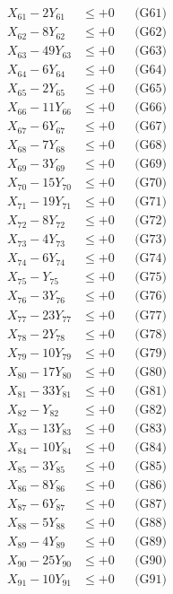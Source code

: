 \documentclass[a4paper,10pt]{article}
\begin{document}
{\begin{align}
X_{61} - 2Y_{61} &\leq +0 && \text{(G61)} \\
X_{62} - 8Y_{62} &\leq +0 && \text{(G62)} \\
X_{63} - 49Y_{63} &\leq +0 && \text{(G63)} \\
\allowbreak
X_{64} - 6Y_{64} &\leq +0 && \text{(G64)} \\
X_{65} - 2Y_{65} &\leq +0 && \text{(G65)} \\
X_{66} - 11Y_{66} &\leq +0 && \text{(G66)} \\
X_{67} - 6Y_{67} &\leq +0 && \text{(G67)} \\
X_{68} - 7Y_{68} &\leq +0 && \text{(G68)} \\
X_{69} - 3Y_{69} &\leq +0 && \text{(G69)} \\
X_{70} - 15Y_{70} &\leq +0 && \text{(G70)} \\
X_{71} - 19Y_{71} &\leq +0 && \text{(G71)} \\
X_{72} - 8Y_{72} &\leq +0 && \text{(G72)} \\
X_{73} - 4Y_{73} &\leq +0 && \text{(G73)} \\
\allowbreak
X_{74} - 6Y_{74} &\leq +0 && \text{(G74)} \\
X_{75} - Y_{75} &\leq +0 && \text{(G75)} \\
X_{76} - 3Y_{76} &\leq +0 && \text{(G76)} \\
X_{77} - 23Y_{77} &\leq +0 && \text{(G77)} \\
X_{78} - 2Y_{78} &\leq +0 && \text{(G78)} \\
X_{79} - 10Y_{79} &\leq +0 && \text{(G79)} \\
X_{80} - 17Y_{80} &\leq +0 && \text{(G80)} \\
X_{81} - 33Y_{81} &\leq +0 && \text{(G81)} \\
X_{82} - Y_{82} &\leq +0 && \text{(G82)} \\
X_{83} - 13Y_{83} &\leq +0 && \text{(G83)} \\
\allowbreak
X_{84} - 10Y_{84} &\leq +0 && \text{(G84)} \\
X_{85} - 3Y_{85} &\leq +0 && \text{(G85)} \\
X_{86} - 8Y_{86} &\leq +0 && \text{(G86)} \\
X_{87} - 6Y_{87} &\leq +0 && \text{(G87)} \\
X_{88} - 5Y_{88} &\leq +0 && \text{(G88)} \\
X_{89} - 4Y_{89} &\leq +0 && \text{(G89)} \\
X_{90} - 25Y_{90} &\leq +0 && \text{(G90)} \\
X_{91} - 10Y_{91} &\leq +0 && \text{(G91)} \\

\end{align}}
\end{document}
